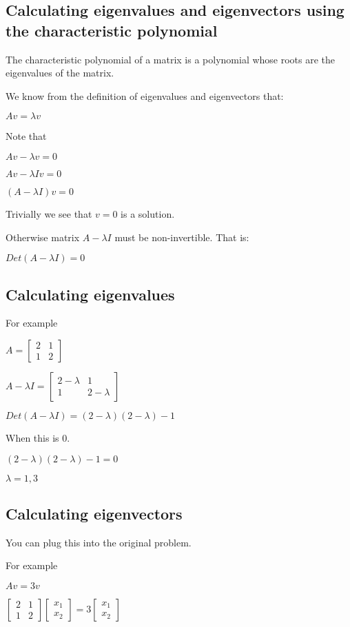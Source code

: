 
\subsection{Calculating eigenvalues and eigenvectors using the characteristic polynomial}

The characteristic polynomial of a matrix is a polynomial whose roots are the eigenvalues of the matrix.

We know from the definition of eigenvalues and eigenvectors that:

$Av=\lambda v$

Note that

$Av-\lambda v=0$

$Av-\lambda Iv=0$

$(A-\lambda I)v=0$

Trivially we see that \(v=0\) is a solution.

Otherwise matrix \(A-\lambda I\) must be non-invertible. That is:

$Det(A-\lambda I)=0$

\subsection{Calculating eigenvalues}

For example

$A=\begin{bmatrix}2&1\\1 & 2\end{bmatrix}$

$A-\lambda I=\begin{bmatrix}2-\lambda &1\\1 & 2-\lambda \end{bmatrix}$

$Det(A-\lambda I)=(2-\lambda )(2-\lambda )-1$

When this is \(0\).

$(2-\lambda )(2-\lambda )-1=0$

$\lambda =1,3$

\subsection{Calculating eigenvectors}

You can plug this into the original problem.

For example

$Av=3v$

$\begin{bmatrix}2&1\\1 & 2\end{bmatrix}\begin{bmatrix}x_1\\x_2\end{bmatrix}=3\begin{bmatrix}x_1\\x_2\end{bmatrix}$

